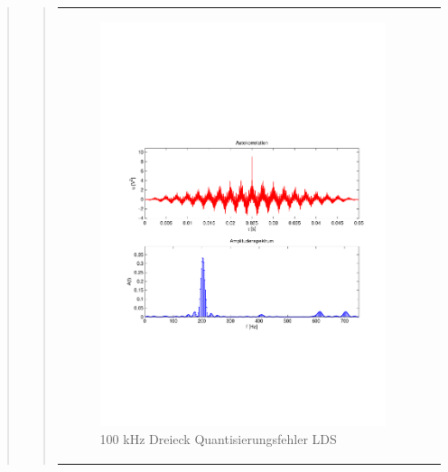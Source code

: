 \begin{quote}
\begin{quote}
\begin{center}
\begin{tabular}{ll}
            \hspace{-4cm}
                \begin{minipage}{0.6\textwidth}
                    \begin{figure}[H]
                        \includegraphics[scale=0.5, trim = 16mm 70mm 16mm 85mm, clip]
                                        {Bilder/100kHz_dreieck_LSD}
                        \caption{100 kHz Dreieck Quantisierungsfehler LDS}
                        \label{fig:100kHz_drei_LDS}
                    \end{figure}
                \end{minipage}
                

\end{tabular}
\end{center}
\end{quote}
\end{quote}
